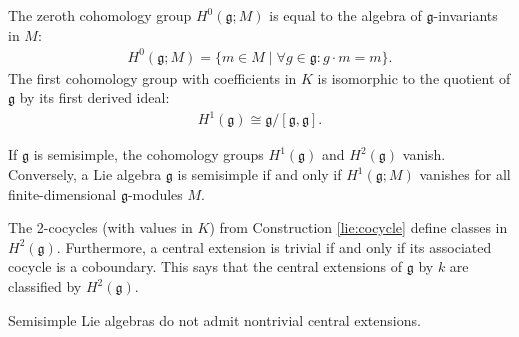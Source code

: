     \begin{property}[$H^0$ and $H^1$]
        The zeroth cohomology group $H^0(\mathfrak{g};M)$ is equal to the algebra of $\mathfrak{g}$-invariants in $M$:
        \begin{gather}
            \label{lie:zeroth_cohomology}
            H^0(\mathfrak{g};M) = \{m\in M\mid\forall g\in\mathfrak{g}:g\cdot m = m\}.
        \end{gather}
        The first cohomology group with coefficients in $K$ is isomorphic to the quotient of $\mathfrak{g}$ by its first derived ideal:
        \begin{gather}
            H^1(\mathfrak{g})\cong\mathfrak{g}/[\mathfrak{g},\mathfrak{g}].
        \end{gather}
    \end{property}

    \begin{property}
        If $\mathfrak{g}$ is semisimple, the cohomology groups $H^1(\mathfrak{g})$ and $H^2(\mathfrak{g})$ vanish. Conversely, a Lie algebra $\mathfrak{g}$ is semisimple if and only if $H^1(\mathfrak{g};M)$ vanishes for all finite-dimensional $\mathfrak{g}$-modules $M$.
    \end{property}

    \begin{property}
        The 2-cocycles (with values in $K$) from Construction \ref{lie:cocycle} define classes in $H^2(\mathfrak{g})$. Furthermore, a central extension is trivial if and only if its associated cocycle is a coboundary. This says that the central extensions of $\mathfrak{g}$ by $k$ are classified by $H^2(\mathfrak{g})$.
    \end{property}
    \begin{result}
        Semisimple Lie algebras do not admit nontrivial central extensions.
    \end{result}


